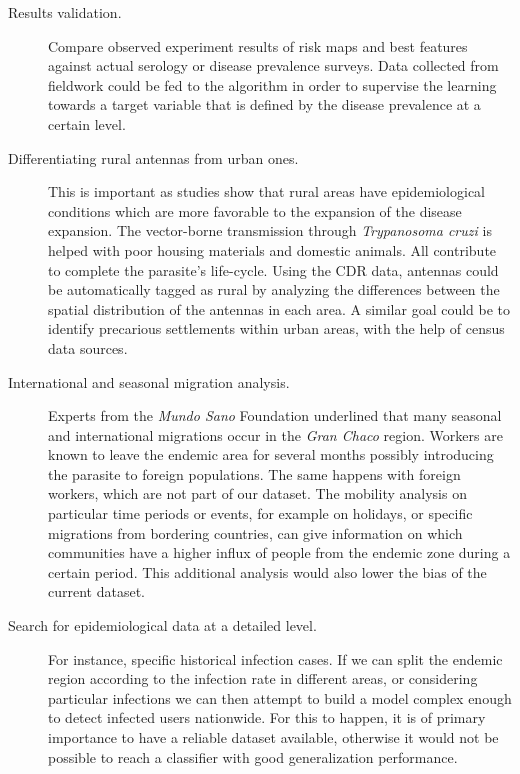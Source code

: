 \begin{description}
    \item [Results validation.] Compare observed experiment results of risk maps and best features against actual serology or disease prevalence surveys.
    Data collected from fieldwork could be fed to the algorithm in order to supervise the learning towards a target variable that is defined by the disease prevalence at a certain level.


    \item [Differentiating rural antennas from urban ones.] This is important as studies show that rural areas have epidemiological conditions which are more favorable to the expansion of the disease expansion.
    The vector-borne transmission through \textit{Trypanosoma cruzi} is helped with poor housing materials and domestic animals.
    All  contribute to complete the parasite's life-cycle.
    Using the CDR data, antennas could be automatically tagged as rural by analyzing the differences between the spatial distribution of the antennas in each area.
    A similar goal could be to identify precarious settlements within urban areas, with the help of census data sources.

    \item [International and seasonal migration analysis.] Experts from the \textit{Mundo Sano} Foundation underlined that many seasonal and international migrations occur in the \textit{Gran Chaco} region.
    Workers are known to leave the endemic area for several months possibly introducing the parasite to foreign populations.
    The same happens with foreign workers, which are not part of our dataset.
    The mobility analysis on particular time periods or events, for example on holidays, or specific migrations from bordering countries, can give information on which communities have a higher influx of people from the endemic zone during a certain period.
    This additional analysis would also lower the bias of the current dataset.


    \item [Search for epidemiological data at a detailed level.] For instance, specific historical infection cases.
    If we can split the endemic region according to the infection rate in different areas, or considering particular infections we can then attempt to build a model complex enough to detect infected users nationwide. %
    For this to happen, it is of primary importance to have a reliable dataset available, otherwise it would not be possible to reach a classifier with good generalization performance.


\end{description}
